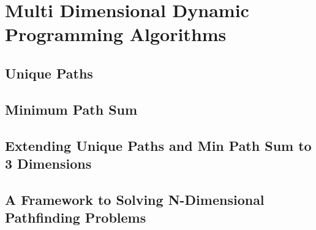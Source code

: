 \chapter{Multi Dimensional Dynamic Programming Algorithms}

\section{Unique Paths}


\section{Minimum Path Sum}


\section{Extending Unique Paths and Min Path Sum to 3 Dimensions}


\section{A Framework to Solving N-Dimensional Pathfinding Problems}
